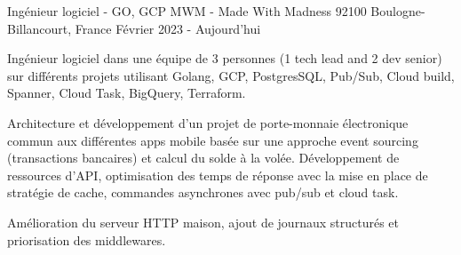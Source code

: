 \cventry
{Ingénieur logiciel - GO, GCP} %
{MWM - Made With Madness} %
{92100 Boulogne-Billancourt, France} %
{Février 2023 - Aujourd'hui} %
{
    \begin{cvitems} %
        \item
        {
            Ingénieur logiciel dans une équipe de 3 personnes (1 tech lead and 2 dev senior) sur différents projets
        utilisant Golang, GCP, PostgresSQL, Pub/Sub, Cloud build, Spanner, Cloud Task, BigQuery, Terraform.
        }
        \item
        {
            Architecture et développement d'un projet de porte-monnaie électronique commun aux différentes apps mobile
            basée sur une approche event sourcing (transactions bancaires) et calcul du solde à la volée.
        Développement de ressources d'API, optimisation des temps de réponse avec la mise en place de stratégie
        de cache, commandes asynchrones avec pub/sub et cloud task.
        }
        \item
        {
            Amélioration du serveur HTTP maison, ajout de journaux structurés et priorisation des middlewares.
        }
    \end{cvitems}
}
